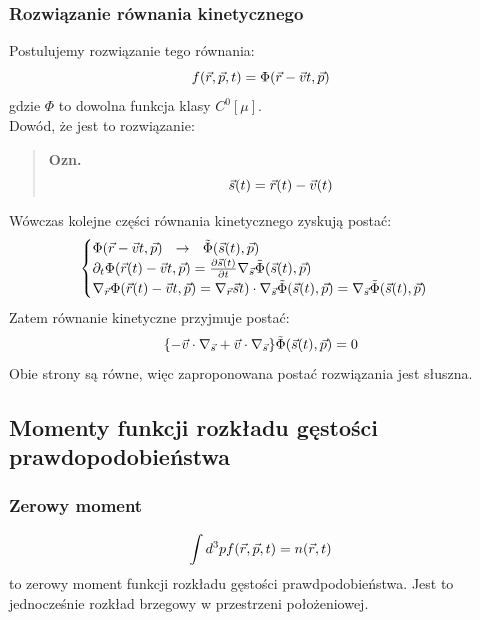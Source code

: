 \subsubsection{Rozwiązanie równania kinetycznego}
Postulujemy rozwiązanie tego równania:
\begin{equation}f(\vec{r},\vec{p},t)=\Phi(\vec{r}-\vec{v} t,\vec{p})\end{equation}
gdzie $\Phi$ to dowolna funkcja klasy $C^0[\mu]$.\\
Dowód, że jest to rozwiązanie:
\begin{verse}\textbf{ Ozn. }
\begin{equation} \vec{s}(t)=\vec{r}(t)-\vec{v}(t)\end{equation} \end{verse}
Wówczas kolejne części równania kinetycznego zyskują postać:
\begin{equation}\begin{cases} \Phi(\vec{r}-\vec{v} t,\vec{p})~~\rightarrow ~~ \tilde{\Phi}(\vec{s}(t),\vec{p}) \\ 
\partial_t\Phi(\vec{r}(t)-\vec{v} t,\vec{p})=\frac{\partial\vec{s}(t)}{\partial t}\nabla_{\vec{s}}\tilde{\Phi}(\vec{s}(t),\vec{p}) \\ 
\nabla_{\vec{r}}\Phi(\vec{r}(t)-\vec{v} t,\vec{p})=\nabla_{\vec{r}}\vec{s}t)\cdot\nabla_{\vec{s}}\tilde{\Phi}(\vec{s}(t),\vec{p})=\nabla_{\vec{s}}\tilde{\Phi}(\vec{s}(t),\vec{p}) \end{cases}\end{equation}
Zatem równanie kinetyczne przyjmuje postać:
\begin{equation}\{-\vec{v}\cdot\nabla_{\vec{s}}+\vec{v}\cdot\nabla_{\vec{s}}\}\tilde{\Phi}(\vec{s}(t),\vec{p})=0\end{equation}
Obie strony są równe, więc zaproponowana postać rozwiązania jest słuszna.
\subsection{Momenty funkcji rozkładu gęstości prawdopodobieństwa}
\subsubsection{Zerowy moment}
\begin{equation}\int d^3pf(\vec{r},\vec{p},t)=n(\vec{r},t)\end{equation}
to zerowy moment funkcji rozkładu gęstości prawdpodobieństwa. Jest to jednocześnie rozkład brzegowy w przestrzeni położeniowej.
